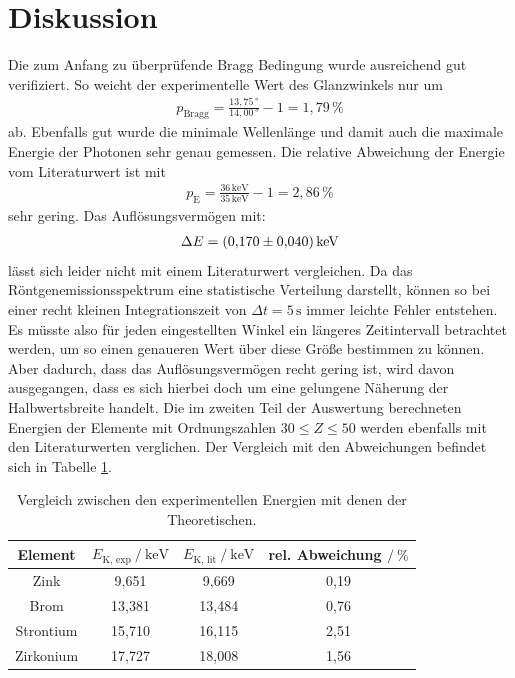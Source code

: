 \section{Diskussion}
\label{sec:Diskussion}
Die zum Anfang zu überprüfende Bragg Bedingung wurde ausreichend gut verifiziert. So weicht der experimentelle Wert des Glanzwinkels
nur um
\begin{align*}
p_\text{Bragg} = \frac{13,75\,°}{14,00\,°} - 1 = 1,79\,\%
\end{align*}
ab. Ebenfalls gut wurde die minimale Wellenlänge und damit auch die maximale Energie der Photonen sehr genau gemessen. Die relative Abweichung
der Energie vom Literaturwert\cite{kent} ist mit
\begin{align*}
p_\text{E} = \frac{36\,\si{\kilo\electronvolt}}{35\,\si{\kilo\electronvolt}} - 1 = 2,86\,\%
\end{align*}
sehr gering.
Das Auflösungsvermögen mit:
\begin{align*}
\Delta E = (\num{0.170 +- 0.040})\,\si{\kilo\electronvolt}
\end{align*}
lässt sich leider nicht mit einem Literaturwert vergleichen. Da das Röntgenemissionsspektrum eine statistische Verteilung darstellt, können so bei einer recht kleinen Integrationszeit
von $\Delta t = 5\,\si{\second}$ immer leichte Fehler entstehen. Es müsste also für jeden eingestellten Winkel ein längeres Zeitintervall betrachtet werden, um so einen genaueren
Wert über diese Größe bestimmen zu können. Aber dadurch, dass das Auflösungsvermögen recht gering ist, wird davon ausgegangen, dass es sich hierbei doch um eine gelungene Näherung
der Halbwertsbreite handelt.
Die im zweiten Teil der Auswertung berechneten Energien der Elemente mit Ordnungszahlen $30 \leq Z \leq 50$ werden ebenfalls mit den Literaturwerten\cite{kent2} verglichen. Der Vergleich mit den
Abweichungen befindet sich in Tabelle \ref{tab:vergleich}.
\begin{table}[H]
  \centering
  \caption{Vergleich zwischen den experimentellen Energien mit denen der Theoretischen.}
  \label{tab:vergleich}
\begin{tabular}{c c c c}
  \toprule
Element & $E_\text{K, exp}\:/\: \si{\kilo\electronvolt}$ & $E_\text{K, lit}\:/\: \si{\kilo\electronvolt}$ & rel. Abweichung $/\:\%$ \\
\midrule
Zink & 9,651 & 9,669 & 0,19\\
Brom & 13,381 & 13,484 & 0,76\\
Strontium & 15,710 & 16,115 & 2,51\\
Zirkonium & 17,727 & 18,008 & 1,56\\
\bottomrule
\end{tabular}
\end{table}
